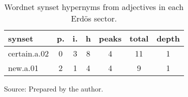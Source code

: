 \begin{table}[h!]
\begin{center}
\caption{Wordnet synset hypernyms from adjectives in each Erd\"os sector.}
	\label{tab:wnash}
\begin{tabular}{| l || c | c | c || c | c | c |}\hline
{\bf synset} & {\bf p.} & {\bf i.} & {\bf h} & {\bf peaks} & {\bf total} & {\bf depth} \\\hline\hline
certain.a.02 & 0  & 3  & 8  & 4  & 11  & 1 \\
new.a.01 & 2  & 1  & 4  & 4  & 9  & 1 \\\hline
\end{tabular}
\begin{flushleft}
		Source: Prepared by the author.\
\end{flushleft}
\end{center}
\end{table}
